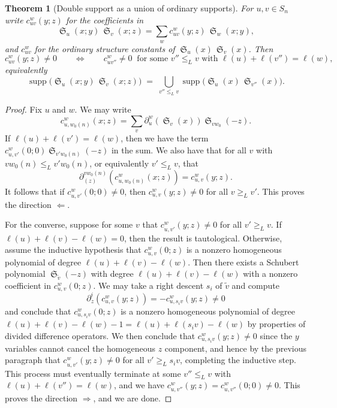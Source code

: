 \documentclass{amsart}
\newtheorem{theorem}[lemma]{Theorem}
\theoremstyle{definition}
\theoremstyle{remark}
\numberwithin{equation}{section}
\DeclareMathOperator{\sch}{\mathfrak{S}}
\begin{document}
\begin{theorem}[Double support as a union of ordinary supports] \label{prop:doublesupport}
For $u,v\in S_n$ write $c_{uv}^{w}(y;z)$ for the coefficients in
$$\sch_u(x;y)\,\sch_v(x;z)=\sum_w c_{uv}^{w}(y;z)\,\sch_w(x;y),$$
and $c_{uv}^{w}$ for the ordinary structure constants of $\sch_u(x)\,\sch_v(x)$. Then
$$c_{uv}^{w}(y;z)\neq 0\qquad\Longleftrightarrow\qquad c_{u v''}^{w}\neq 0\ \text{ for some }v''\leq_L v\text{ with }\ell(u)+\ell(v'')=\ell(w),$$
equivalently
$$\operatorname{supp}\bigl(\sch_u(x;y)\,\sch_v(x;z)\bigr)\;=\;\bigcup_{v''\leq_L v}\operatorname{supp}\bigl(\sch_u(x)\,\sch_{v''}(x)\bigr).$$
\end{theorem}
\begin{proof}
  Fix $u$ and $w$. We may write
  $$c_{u,w_0(n)}^w(x;z)=\sum_{v}\partial_u^w(\sch_v(x))\sch_{vw_0}(-z).$$
  If $\ell(u)+\ell(v') = \ell(w)$, then we have the term $c_{u,v'}^w(0;0)\sch_{v'w_0(n)}(-z)$ in the sum. We also have that for all $v$ with $vw_0(n)\leq_L v'w_0(n)$, or equivalently $v'\leq_L v$, that
  $$\partial_{(z)}^{vw_0(n)}(c_{u,w_0(n)}^w(x;z)) = c_{u,v}^w(y;z).$$
  It follows that if $c_{u,v'}^w(0;0)\neq 0$, then $c_{u,v}^w(y;z)\neq 0$ for all $v\geq_L v'$. This proves the direction $\Leftarrow$. 
  
  For the converse, suppose for some $v$ that $c_{u,v'}^w(y;z)\neq 0$ for all $v'\geq_L v$. If $\ell(u)+\ell(v)-\ell(w)=0$, then the result is tautological. Otherwise, assume the inductive hypothesis that $c_{u,v}^w(0;z)$ is a nonzero homogeneous polynomial of degree $\ell(u)+\ell(v)-\ell(w)$. Then there exists a Schubert polynomial $\sch_{\widetilde{v}}(-z)$ with degree $\ell(u)+\ell(v)-\ell(w)$ with a nonzero coefficient in $c_{u,v}^w(0;z)$. We may take a right descent $s_i$ of $\widetilde{v}$ and compute
  $$\partial^i_z(c_{u,v}^w(y;z)) = -c_{u,s_iv}^w(y;z)\neq 0$$
  and conclude that $c_{u,s_iv}^w(0;z)$ is a nonzero homogeneous polynomial of degree $\ell(u)+\ell(v)-\ell(w) - 1 = \ell(u)+\ell(s_iv)-\ell(w)$ by properties of divided difference operators. We then conclude that $c_{u,s_iv}^w(y;z)\neq 0$ since the $y$ variables cannot cancel the homogeneous $z$ component, and hence by the previous paragraph that $c_{u,v'}^w(y;z)\neq 0$ for all $v'\geq_L s_iv$, completing the inductive step. This process must eventually terminate at some $v''\leq_L v$ with $\ell(u)+\ell(v'')=\ell(w)$, and we have $c_{u,v''}^w(y;z)=c_{u,v''}^w(0;0)\neq 0$. This proves the direction $\Rightarrow$, and we are done. 
\end{proof}
\end{document}
